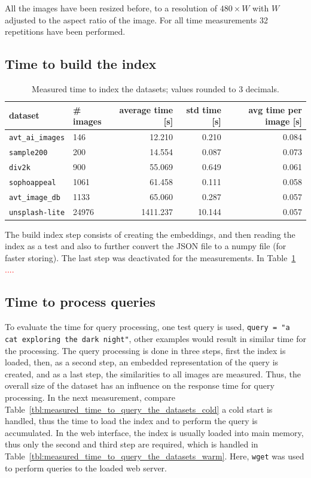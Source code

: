 \documentclass{article}
\newcommand{\todo}[1]{\textcolor{red}{#1}}
\begin{document}
All the images have been resized before, to a resolution of $480\times W$ with $W$ adjusted to the aspect ratio of the image.
For all time measurements 32 repetitions have been performed.

\subsection{Time to build the index}

\begin{table}[htb!]
\centering
\caption{Measured time to index the datasets; values rounded to 3 decimals.}
\label{tbl:measured_time_to_index_the_datasets_}
\begin{tabular}{llrrr}
\toprule
dataset                  & \# images & average time [s] & std time [s] & avg time per image [s] \\
\midrule
\texttt{avt\_ai\_images} & 146       & 12.210            & 0.210         & 0.084 \\
\texttt{sample200}       & 200       & 14.554           & 0.087        & 0.073 \\
\texttt{div2k}           & 900       & 55.069           & 0.649        & 0.061 \\
\texttt{sophoappeal}     & 1061      & 61.458           & 0.111        & 0.058 \\
\texttt{avt\_image\_db}  & 1133      & 65.060            & 0.287        & 0.057 \\
\texttt{unsplash-lite}   & 24976     & 1411.237         & 10.144       & 0.057 \\
\bottomrule
\end{tabular}
\end{table}


The build index step consists of creating the embeddings, and then reading the index as a test and also to further convert the JSON file to a numpy file (for faster storing). The last step was deactivated for the measurements.
In Table~\ref{tbl:measured_time_to_index_the_datasets_} \todo{....}

\subsection{Time to process queries}
To evaluate the time for query processing, one test query is used, \texttt{query = "a cat exploring the dark night"}, other examples would result in similar time for the processing.
The query processing is done in three steps, first the index is loaded, then, as a second step, an embedded representation of the query is created, and as a last step, the similarities to all images are measured.
Thus, the overall size of the dataset has an influence on the response time for query processing.
In the next measurement, compare Table~\ref{tbl:measured_time_to_query_the_datasets_cold} a cold start is handled, thus the time to load the index and to perform the query is accumulated.
In the web interface, the index is usually loaded into main memory, thus only the second and third step are required, which is handled in Table~\ref{tbl:measured_time_to_query_the_datasets_warm}.
Here, \texttt{wget} was used to perform queries to the loaded web server.
\end{document}
